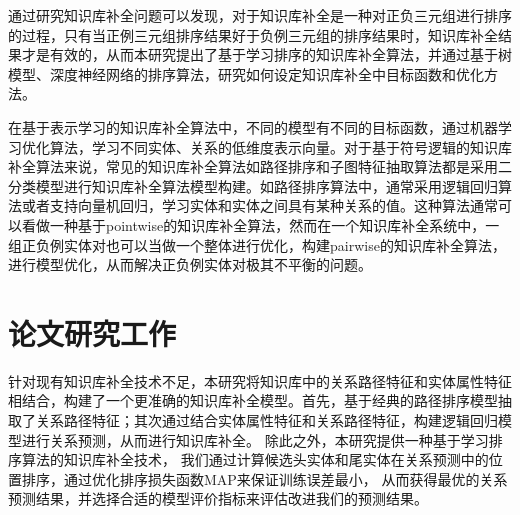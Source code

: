 通过研究知识库补全问题可以发现，对于知识库补全是一种对正负三元组进行排序的过程，只有当正例三元组排序结果好于负例三元组的排序结果时，知识库补全结果才是有效的，从而本研究提出了基于学习排序的知识库补全算法，并通过基于树模型、深度神经网络的排序算法，研究如何设定知识库补全中目标函数和优化方法。

在基于表示学习的知识库补全算法中，不同的模型有不同的目标函数，通过机器学习优化算法，学习不同实体、关系的低维度表示向量。对于基于符号逻辑的知识库补全算法来说，常见的知识库补全算法如路径排序和子图特征抽取算法都是采用二分类模型进行知识库补全算法模型构建。如路径排序算法中，通常采用逻辑回归算法或者支持向量机回归，学习实体和实体之间具有某种关系的值。这种算法通常可以看做一种基于pointwise的知识库补全算法，然而在一个知识库补全系统中，一组正负例实体对也可以当做一个整体进行优化，构建pairwise的知识库补全算法，进行模型优化，从而解决正负例实体对极其不平衡的问题。

\section{论文研究工作}

针对现有知识库补全技术不足，本研究将知识库中的关系路径特征和实体属性特征相结合，构建了一个更准确的知识库补全模型。首先，基于经典的路径排序模型抽取了关系路径特征；其次通过结合实体属性特征和关系路径特征，构建逻辑回归模型进行关系预测，从而进行知识库补全。
除此之外，本研究提供一种基于学习排序算法的知识库补全技术，
我们通过计算候选头实体和尾实体在关系预测中的位置排序，通过优化排序损失函数MAP来保证训练误差最小，
从而获得最优的关系预测结果，并选择合适的模型评价指标来评估改进我们的预测结果。

